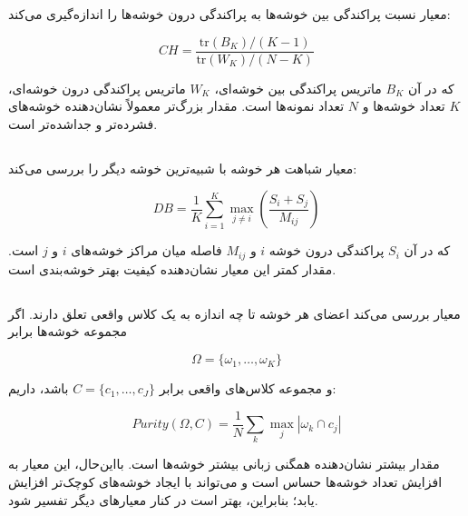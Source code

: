 معیار
نسبت پراکندگی بین خوشه‌ها به پراکندگی درون خوشه‌ها را اندازه‌گیری می‌کند:

\begin{equation}
CH
=
\frac{
\mathrm{tr}(B_K)/(K-1)
}{
\mathrm{tr}(W_K)/(N-K)
}
\end{equation}

که در آن $B_K$ ماتریس پراکندگی بین خوشه‌ای، $W_K$ ماتریس پراکندگی درون خوشه‌ای، $K$ تعداد خوشه‌ها و $N$ تعداد نمونه‌ها است. مقدار بزرگ‌تر معمولاً نشان‌دهنده خوشه‌های فشرده‌تر و جداشده‌تر است.


\subsection{}

معیار
شباهت هر خوشه با شبیه‌ترین خوشه دیگر را بررسی می‌کند:

\begin{equation}
DB
=
\frac{1}{K}
\sum_{i=1}^{K}
\max_{j\neq i}
\left(
\frac{S_i+S_j}{M_{ij}}
\right)
\end{equation}

که در آن $S_i$ پراکندگی درون خوشه $i$ و $M_{ij}$ فاصله میان مراکز خوشه‌های $i$ و $j$ است. مقدار کمتر این معیار نشان‌دهنده کیفیت بهتر خوشه‌بندی است.


\subsection{}

معیار
بررسی می‌کند اعضای هر خوشه تا چه اندازه به یک کلاس واقعی تعلق دارند. اگر مجموعه خوشه‌ها برابر

\begin{equation}
\Omega=\{\omega_1,\ldots,\omega_K\}
\end{equation}

و مجموعه کلاس‌های واقعی برابر $C=\{c_1,\ldots,c_J\}$ باشد، داریم:

\begin{equation}
Purity(\Omega,C)
=
\frac{1}{N}
\sum_k
\max_j
|\omega_k\cap c_j|
\end{equation}

مقدار بیشتر نشان‌دهنده همگنی زبانی بیشتر خوشه‌ها است. بااین‌حال، این معیار به افزایش تعداد خوشه‌ها حساس است و می‌تواند با ایجاد خوشه‌های کوچک‌تر افزایش یابد؛ بنابراین، بهتر است در کنار معیارهای دیگر تفسیر شود.


